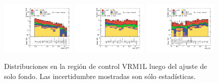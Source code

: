 \begin{figure}[ht!]
\begin{center}
    \includegraphics[width=0.32\textwidth]{images_tmp/results/fr2/can_VRM1L_dphi_jetmet_afterFit.pdf}
    \includegraphics[width=0.32\textwidth]{images_tmp/results/fr2/can_VRM1L_dphi_gammet_afterFit.pdf}
    \includegraphics[width=0.32\textwidth]{images_tmp/results/fr2/can_VRM1L_dphi_gamjet_afterFit.pdf}

    \caption{Distribuciones en la región de control VRM1L luego del ajuste de solo fondo. Las incertidumbre mostradas son sólo estadísticas.}
    \label{fig:dist_vrm1l_bkgonly}
  \end{center}
\end{figure}

